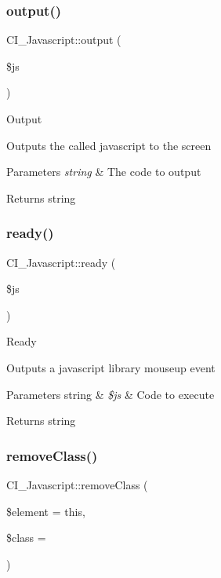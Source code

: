\subsubsection{\texorpdfstring{output()}{output()}}
{\footnotesize\ttfamily C\+I\+\_\+\+Javascript\+::output (\begin{DoxyParamCaption}\item[{}]{\$js }\end{DoxyParamCaption})}

Output

Outputs the called javascript to the screen


\begin{DoxyParams}{Parameters}
{\em string} & The code to output \\
\hline
\end{DoxyParams}
\begin{DoxyReturn}{Returns}
string 
\end{DoxyReturn}
\mbox{\label{class_c_i___javascript_a5a91133b6ea3bbf7b1b0b41bcaa93245}} 
\subsubsection{\texorpdfstring{ready()}{ready()}}
{\footnotesize\ttfamily C\+I\+\_\+\+Javascript\+::ready (\begin{DoxyParamCaption}\item[{}]{\$js }\end{DoxyParamCaption})}

Ready

Outputs a javascript library mouseup event


\begin{DoxyParams}[1]{Parameters}
string & {\em \$js} & Code to execute \\
\hline
\end{DoxyParams}
\begin{DoxyReturn}{Returns}
string 
\end{DoxyReturn}
\mbox{\label{class_c_i___javascript_a19763bb9f96f2c1b812fe67d2a3bda9f}} 
\subsubsection{\texorpdfstring{remove\+Class()}{removeClass()}}
{\footnotesize\ttfamily C\+I\+\_\+\+Javascript\+::remove\+Class (\begin{DoxyParamCaption}\item[{}]{\$element = {\ttfamily \textquotesingle{}this\textquotesingle{}},  }\item[{}]{\$class = {\ttfamily \textquotesingle{}\textquotesingle{}} }\end{DoxyParamCaption})}

